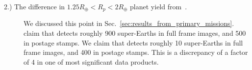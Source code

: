\begin{description}
	\item[2.) The difference in $1.25R_\oplus<R_p<2R_\oplus$ planet yield from~\protect{}.]
	We discussed this point in Sec.~\ref{sec:results_from_primary_missions}.
	 claim that \tess detects roughly 900 super-Earths in full frame images, and 500 in postage stamps.
	We claim that \tess detects roughly 10 super-Earths in full frame images, and 400 in postage stamps.
	This is a discrepancy of a factor of 4 in one of \tesss most significant data products.

\end{description}
